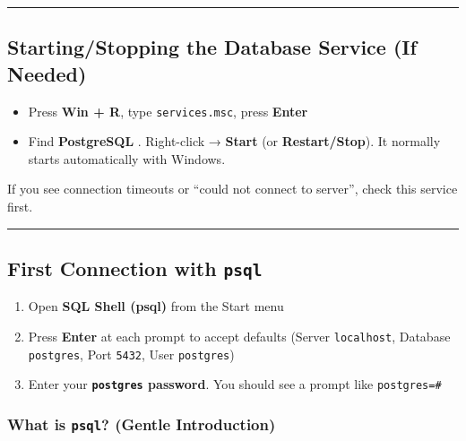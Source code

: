 \documentclass[
  letterpaper,
  DIV=11,
  numbers=noendperiod]{scrartcl}
\providecommand{\tightlist}{%
  \setlength{\itemsep}{0pt}\setlength{\parskip}{0pt}}\usepackage{longtable,booktabs,array}
\begin{document}
\begin{center}\rule{0.5\linewidth}{0.5pt}\end{center}

\subsection{Starting/Stopping the Database Service (If
Needed)}\label{startingstopping-the-database-service-if-needed}

\begin{itemize}
\tightlist
\item
  Press \textbf{Win + R}, type \texttt{services.msc}, press
  \textbf{Enter}
\item
  Find \textbf{PostgreSQL }. Right-click → \textbf{Start} (or
  \textbf{Restart/Stop}). It normally starts automatically with Windows.
\end{itemize}

If you see connection timeouts or ``could not connect to server'', check
this service first.

\begin{center}\rule{0.5\linewidth}{0.5pt}\end{center}

\subsection{\texorpdfstring{First Connection with
\texttt{psql}}{First Connection with psql}}\label{first-connection-with-psql}

\begin{enumerate}
\def\labelenumi{\arabic{enumi}.}
\tightlist
\item
  Open \textbf{SQL Shell (psql)} from the Start menu
\item
  Press \textbf{Enter} at each prompt to accept defaults (Server
  \texttt{localhost}, Database \texttt{postgres}, Port \texttt{5432},
  User \texttt{postgres})
\item
  Enter your \textbf{\texttt{postgres} password}. You should see a
  prompt like \texttt{postgres=\#}
\end{enumerate}

\subsubsection{\texorpdfstring{What is \texttt{psql}? (Gentle
Introduction)}{What is psql? (Gentle Introduction)}}\label{what-is-psql-gentle-introduction}
\end{document}
